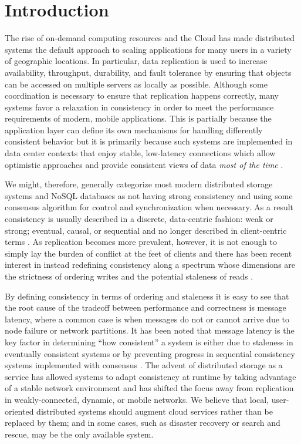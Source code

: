 \documentclass[10pt,conference,letterpaper]{IEEEtran}
\begin{document}
\section{Introduction}


The rise of on-demand computing resources and the Cloud has made distributed systems the
default approach to scaling applications for many users in a variety of geographic
locations.
In particular, data replication is used to increase availability, throughput, durability,
and fault tolerance by ensuring that objects can be accessed on multiple servers as
locally as possible.
Although some coordination is necessary to ensure that replication happens correctly, many
systems favor a relaxation in consistency in order to meet the performance requirements of
modern, mobile applications.
This is partially because the application layer can define its own mechanisms for handling
differently consistent behavior but it is primarily because such systems are implemented
in data center contexts that enjoy stable, low-latency connections which allow optimistic
approaches and provide consistent views of data \emph{most of the time}
\cite{bailis_quantifying_2014,bermbach_metastorage:_2011}.

We might, therefore, generally categorize most modern distributed storage systems and
NoSQL databases as not having strong consistency and using some consensus algorithm for
control and synchronization when necessary.
As a result consistency is usually described in a discrete, data-centric fashion: weak or
strong; eventual, causal, or sequential and no longer described in client-centric terms
\cite{bermbach_consistency_2013}.
As replication becomes more prevalent, however, it is not enough to simply lay the burden
of conflict at the feet of clients and there has been recent interest in instead
redefining consistency along a spectrum whose dimensions are the strictness of ordering
writes and the potential staleness of reads
\cite{yu_design_2002,li_making_2012,afek_quasi-linearizability:_2010,al-ekram_multi-consistency_2010,krishnamurthy_adaptive_2002}.

By defining consistency in terms of ordering and staleness it is easy to see that the root
cause of the tradeoff between performance and correctness is message latency, where a
common case is when messages do not or cannot arrive due to node failure or network
partitions.
It has been noted that message latency is the key factor in determining ``how consistent''
a system is either due to staleness in eventually consistent systems
\cite{bailis_probabilistically_2012} or by preventing progress in sequential consistency
systems implemented with consensus \cite{howard_raft_2015}.
The advent of distributed storage as a service has allowed systems to adapt consistency at
runtime by taking advantage of a stable network environment
\cite{chihoub_harmony:_2012,chihoub_consistency_2013,kraska_consistency_2009,pitoura_data_1999,deno-toc} and has
shifted the focus away from replication in weakly-connected, dynamic, or mobile networks.
We believe that local, user-oriented distributed systems should augment
cloud services rather than be replaced by them; and in some cases, such as disaster
recovery or search and rescue, may be the only available system.
\end{document}
